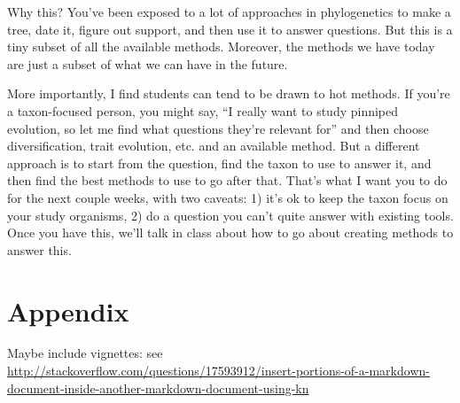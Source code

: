 \documentclass[]{book}
\theoremstyle{definition}
\theoremstyle{definition}
\theoremstyle{remark}
\begin{document}
Why this? You've been exposed to a lot of approaches in phylogenetics to
make a tree, date it, figure out support, and then use it to answer
questions. But this is a tiny subset of all the available methods.
Moreover, the methods we have today are just a subset of what we can
have in the future.

More importantly, I find students can tend to be drawn to hot methods.
If you're a taxon-focused person, you might say, ``I really want to
study pinniped evolution, so let me find what questions they're relevant
for'' and then choose diversification, trait evolution, etc. and an
available method. But a different approach is to start from the
question, find the taxon to use to answer it, and then find the best
methods to use to go after that. That's what I want you to do for the
next couple weeks, with two caveats: 1) it's ok to keep the taxon focus
on your study organisms, 2) do a question you can't quite answer with
existing tools. Once you have this, we'll talk in class about how to go
about creating methods to answer this.

\chapter{Appendix}\label{appendix}

Maybe include vignettes: see
\url{http://stackoverflow.com/questions/17593912/insert-portions-of-a-markdown-document-inside-another-markdown-document-using-kn}


\end{document}
